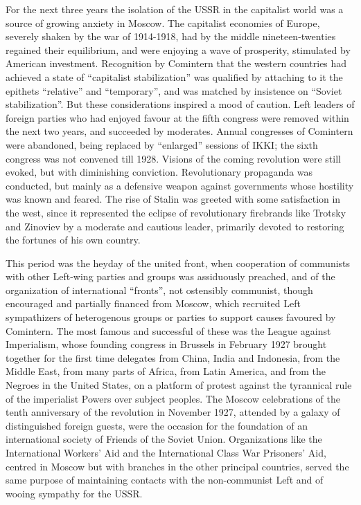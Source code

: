 For the next three years the isolation of the USSR in the capitalist world was a source of growing anxiety in Moscow. The capitalist economies of Europe, severely shaken by the war of 1914-1918, had by the middle nineteen-twenties regained their equilibrium, and were enjoying a wave of prosperity, stimulated by American investment. Recognition by Comintern that the western countries had achieved a state of ``capitalist stabilization'' was qualified by attaching to it the epithets ``relative'' and ``temporary'', and was matched by insistence on ``Soviet stabilization''. But these considerations inspired a mood of caution. Left leaders of foreign parties who had enjoyed favour at the fifth congress were removed within the next two years, and succeeded by moderates. Annual congresses of Comintern were abandoned, being replaced by ``enlarged'' sessions of IKKI; the sixth congress was not convened till 1928. Visions of the coming revolution were still evoked, but with diminishing conviction. Revolutionary propaganda was conducted, but mainly as a defensive weapon against governments whose hostility was known and feared. The rise of Stalin was greeted with some satisfaction in the west, since it represented the eclipse of revolutionary firebrands like Trotsky and Zinoviev by a moderate and cautious leader, primarily devoted to restoring the fortunes of his own country. 

This period was the heyday of the united front, when cooperation of communists with other Left-wing parties and groups was assiduously preached, and of the organization of international ``fronts'', not ostensibly communist, though encouraged and partially financed from Moscow, which recruited Left sympathizers of heterogenous groups or parties to support causes favoured by Comintern. The most famous and successful of these was the League against Imperialism, whose founding congress in Brussels in February 1927 brought together for the first time delegates from China, India and Indonesia, from the Middle East, from many parts of Africa, from Latin America, and from the Negroes in the United States, on a platform of protest against the tyrannical rule of the imperialist Powers over subject peoples. The Moscow celebrations of the tenth anniversary of the revolution in November 1927, attended by a galaxy of distinguished foreign guests, were the occasion for the foundation of an international society of Friends of the Soviet Union. Organizations like the International Workers' Aid and the International Class War Prisoners' Aid, centred in Moscow but with branches in the other principal countries, served the same purpose of maintaining contacts with the non-communist Left and of wooing sympathy for the USSR. 

